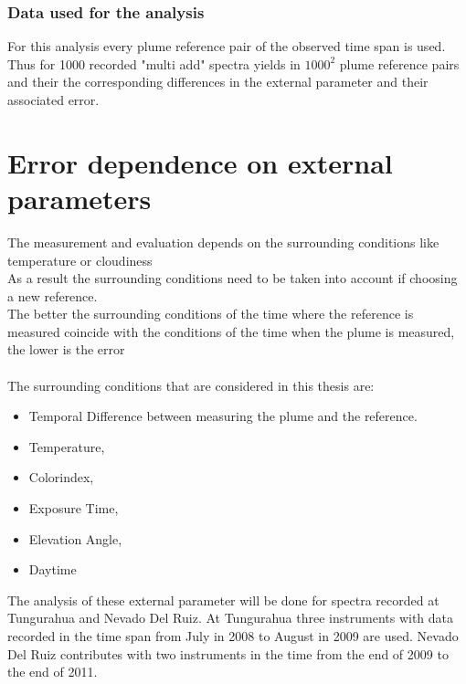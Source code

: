 \documentclass  [
  paper    = a4,
  BCOR     = 10mm,
  twoside,
  fontsize = 12pt,
  fleqn,
  toc      = bibnumbered,
  toc      = listofnumbered,
  numbers  = noendperiod,
  headings = normal,
  listof   = leveldown,
  version  = 3.03
]                                       {scrreprt}
\begin{document}
	\subsubsection*{Data used for the analysis}
	For this analysis every plume reference pair of the observed time span is used. Thus for 1000 recorded "multi add" spectra yields in $1000^2$ plume reference pairs and their the corresponding differences in the external parameter and their associated  error.

	\section{ Error dependence on external parameters \label{Chap:BROErr}}
	The measurement and evaluation depends on the surrounding conditions like temperature or cloudiness \citep{lubcke2014optical}\\
	As a result the surrounding conditions need to be taken into account if choosing a new reference.\\
	The better the surrounding conditions of the time where the reference is measured coincide with the conditions of the time when the plume is measured, the lower is the  error \\
	\\

	The surrounding conditions that are considered in this thesis are: 
	\begin{itemize}
		\item Temporal Difference between measuring the plume and the reference.
		\item Temperature, 
		\item Colorindex, 
		\item Exposure Time, 
		\item Elevation Angle, 
		\item Daytime 	
	\end{itemize}
	The analysis of these external parameter will be done for spectra recorded at Tungurahua and Nevado Del Ruiz. At Tungurahua three instruments with data recorded in the time span from July in 2008 to August in 2009 are used. Nevado Del Ruiz contributes with two instruments in the time from the end of 2009 to the end of 2011.
	
	
	
	
\end{document}

